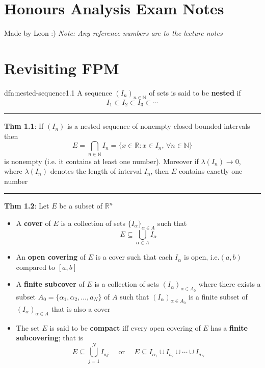 \documentclass[landscape, 8pt]{extarticle}
\begin{document}
\setlength{\abovedisplayskip}{3.5pt}
\setlength{\belowdisplayskip}{3.5pt}
\setlength{\abovedisplayshortskip}{3.5pt}
\setlength{\belowdisplayshortskip}{3.5pt}

\begin{multicols}{3}
\raggedcolumns


\section*{\huge Honours Analysis Exam Notes}
Made by Leon :) \textit{Note: Any reference numbers are to the lecture notes}

\vspace{-5pt}
\section{Revisiting FPM}

\begin{dfn}{dfn:nested-sequence}{1.1}
	A sequence $(I_{n})_{n\in\mathbb{N}}$ of sets is said to be \textbf{nested} if
	\[I_{1} \subset I_{2} \subset I_{3} \subset \cdots\]

	\noindent\rule{\textwidth}{0.2pt}
	\textbf{Thm 1.1}: If $(I_{n})$ is a nested sequence of nonempty closed bounded intervals then
	$$E = \bigcap\limits_{n\in\mathbb{N}} I_{n} = \{x\in\mathbb{R}: x\in I_{n},\,\forall n\in\mathbb{N}\}$$
	is nonempty (i.e. it contains at least one number). Moreover if $\lambda(I_{n})\to 0$, where $\lambda(I_{n})$ denotes the length of interval $I_{n}$, then $E$ contains exactly one number

	\noindent\rule{\textwidth}{0.2pt}
	\textbf{Thm 1.2}: Let $E$ be a subset of $\mathbb{R}^n$
	\begin{itemize}
		\setlength\itemsep{0em}
		\item A \textbf{cover} of $E$ is a collection of sets  $\{I_{\alpha}\}_{\alpha\in A}$ such that
			\[E\subseteq \bigcup\limits_{\alpha\in A} I_{\alpha}\]
		\item An \textbf{open covering} of $E$ is a cover such that each $I_{\alpha}$ is open, i.e.$(a,b)$ compared to $[a,b]$
		\item A \textbf{finite subcover} of $E$ is a collection of sets $(I_{\alpha})_{\alpha\in A_{0}}$ where there exists a subset $A_{0} = \{\alpha_{1}, \alpha_{2}, \dots, a_{N}\}$ of $A$ such that $(I_{\alpha})_{\alpha\in A_{0}}$ is a finite subset of $(I_{\alpha})_{\alpha\in A}$ that is also a cover
		\item The set $E$ is said to be \textbf{compact} iff every open covering of $E$ has a \textbf{finite subcovering}; that is
			\[E\subseteq \bigcup\limits_{j=1}^{N} I_{aj} \quad \text{ or } \quad E \subseteq I_{\alpha_{1}} \cup I_{a_{2}} \cup \cdots \cup I_{a_{N}}\]
	\end{itemize}
\end{dfn}


\end{multicols}
\end{document}
